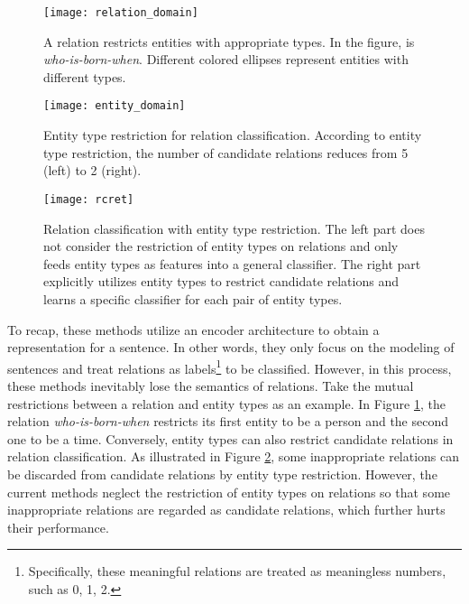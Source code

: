 \documentclass[11pt,a4paper]{article}
\begin{document}
\begin{figure}[t]
	\centering
	\texttt{[image: relation\_domain]}
	\caption{A relation restricts entities  with appropriate types. 
		In the figure,   is \textit{who-is-born-when}. 
		Different colored ellipses represent entities with different types.
	}
	\label{fig:relation_domain}
\end{figure}

\begin{figure}[t]
	\centering
	\texttt{[image: entity\_domain]}
	\caption{Entity type restriction for relation classification. 
		According to entity type restriction, the number of candidate relations reduces from 5 (left) to 2 (right).}
	\label{fig:entity_type_restriction}
\end{figure}

\begin{figure*}[t]
	\centering
	\texttt{[image: rcret]}
	\caption{Relation classification with entity type restriction. 
The left part  does not consider the restriction of entity types on relations and 
		only feeds entity types as features into a general classifier. 
		The right part explicitly utilizes entity types to restrict candidate relations and 
		learns a specific classifier for each pair of entity types.
	}
	\label{fig:rcret}
\end{figure*}

To recap, these methods utilize an encoder architecture \cite{Badrinarayanan-etal-2017-segnet} to obtain a representation for a sentence. 
In other words, they only focus on the modeling of sentences and treat relations as 
labels\footnote{Specifically, these meaningful relations are treated as meaningless numbers, such as 0, 1, 2. } to be classified.
However, in this process, these methods inevitably lose the semantics of relations.  
Take the mutual restrictions between a relation and entity types as an example.
In Figure \ref{fig:relation_domain}, the relation \textit{who-is-born-when} 
restricts its first entity to be a person and the second one to be a time.
Conversely, entity types  can also restrict candidate relations in relation classification.
As illustrated in Figure \ref{fig:entity_type_restriction}, 
some inappropriate relations can be discarded from candidate relations by entity type restriction. 
However, the current methods neglect the restriction of entity types on relations 
so that some inappropriate relations are regarded as candidate relations, 
which further hurts their performance. 
\end{document}
